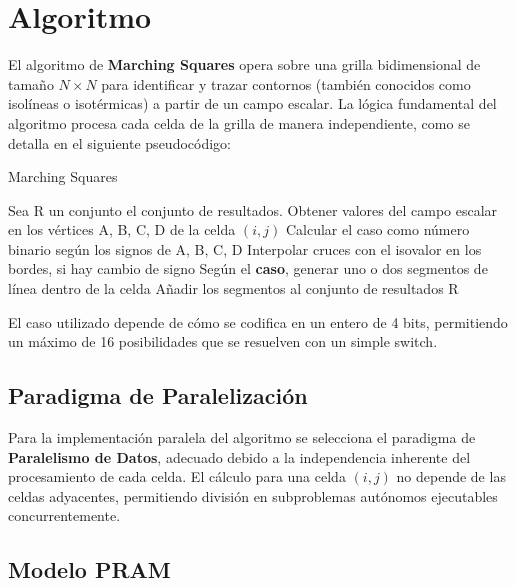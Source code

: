 \documentclass[12pt, A4]{article}
\begin{document}
\section{Algoritmo}
El algoritmo de \textbf{Marching Squares} opera sobre una grilla bidimensional de tamaño $N \times N$ para identificar y trazar contornos (también conocidos como isolíneas o isotérmicas) a partir de un campo escalar. La lógica fundamental del algoritmo procesa cada celda de la grilla de manera independiente, como se detalla en el siguiente pseudocódigo:

\begin{algorithm}
\caption{Marching Squares}
\begin{algorithmic}[1]
\State Sea R un conjunto el conjunto de resultados.
        \State Obtener valores del campo escalar en los vértices A, B, C, D de la celda $(i,j)$
        \State Calcular el caso como número binario según los signos de A, B, C, D
        \State Interpolar cruces con el isovalor en los bordes, si hay cambio de signo
        \State Según el \textbf{caso}, generar uno o dos segmentos de línea dentro de la celda
        \State Añadir los segmentos al conjunto de resultados
    \EndFor
\EndFor
\State \Return R 
\end{algorithmic}
\end{algorithm}

El caso utilizado depende de cómo se codifica en un entero de 4 bits, permitiendo un máximo de 16 posibilidades que se resuelven con un simple switch.

\subsection{Paradigma de Paralelización}

Para la implementación paralela del algoritmo se selecciona el paradigma de \textbf{Paralelismo de Datos}, adecuado debido a la independencia inherente del procesamiento de cada celda. El cálculo para una celda $(i, j)$ no depende de las celdas adyacentes, permitiendo división en subproblemas autónomos ejecutables concurrentemente.

\subsection{Modelo PRAM}
\end{document}
